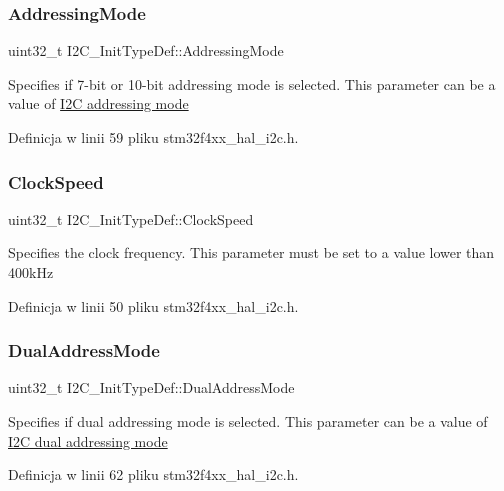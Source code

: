 \subsubsection{\texorpdfstring{Addressing\+Mode}{AddressingMode}}
{\footnotesize\ttfamily uint32\+\_\+t I2\+C\+\_\+\+Init\+Type\+Def\+::\+Addressing\+Mode}

Specifies if 7-\/bit or 10-\/bit addressing mode is selected. This parameter can be a value of \hyperlink{group___i2_c__addressing__mode}{I2C addressing mode} 

Definicja w linii 59 pliku stm32f4xx\+\_\+hal\+\_\+i2c.\+h.

\mbox{\label{struct_i2_c___init_type_def_a45f1209e7e43e55f055bd9ead064230a}} 
\subsubsection{\texorpdfstring{Clock\+Speed}{ClockSpeed}}
{\footnotesize\ttfamily uint32\+\_\+t I2\+C\+\_\+\+Init\+Type\+Def\+::\+Clock\+Speed}

Specifies the clock frequency. This parameter must be set to a value lower than 400k\+Hz 

Definicja w linii 50 pliku stm32f4xx\+\_\+hal\+\_\+i2c.\+h.

\mbox{\label{struct_i2_c___init_type_def_add6a6b87ee067d33c94c554288736d40}} 
\subsubsection{\texorpdfstring{Dual\+Address\+Mode}{DualAddressMode}}
{\footnotesize\ttfamily uint32\+\_\+t I2\+C\+\_\+\+Init\+Type\+Def\+::\+Dual\+Address\+Mode}

Specifies if dual addressing mode is selected. This parameter can be a value of \hyperlink{group___i2_c__dual__addressing__mode}{I2C dual addressing mode} 

Definicja w linii 62 pliku stm32f4xx\+\_\+hal\+\_\+i2c.\+h.

